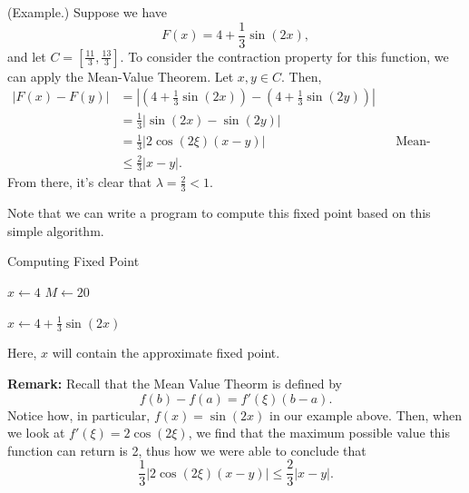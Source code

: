 \documentclass[letterpaper]{article}
\begin{document}
\begin{mdframed}
    (Example.) Suppose we have \[F(x) = 4 + \frac{1}{3}\sin(2x),\] and let $C = \left[\frac{11}{3}, \frac{13}{3}\right].$ To consider the contraction property for this function, we can apply the Mean-Value Theorem. Let $x, y \in C$. Then, 
    \[\begin{aligned}
        |F(x) - F(y)| &= \left|\left(4 + \frac{1}{3}\sin(2x)\right) - \left(4 + \frac{1}{3}\sin(2y)\right)\right| \\ 
            &= \frac{1}{3}|\sin(2x) - \sin(2y)| \\ 
            &= \frac{1}{3}|2\cos(2\xi)(x - y)| && \text{Mean-Value Theorem, See Remark} \\ 
            &\leq \frac{2}{3}\left|x - y\right|.
    \end{aligned}\]
    From there, it's clear that $\lambda = \frac{2}{3} < 1$. 

    \bigskip 

    Note that we can write a program to compute this fixed point based on this simple algorithm. 
    \begin{algorithm}[H]
        \caption{Computing Fixed Point}
        \label{alg:two}
        \begin{algorithmic}[1]
            \State $x \gets 4$
            \State $M \gets 20$

                \State $x \gets 4 + \frac{1}{3}\sin(2x)$
            \EndFor 
        \end{algorithmic}
    \end{algorithm}
    Here, $x$ will contain the approximate fixed point.
\end{mdframed}
\textbf{Remark:} Recall that the Mean Value Theorm is defined by  
\[f(b) - f(a) = f'(\xi)(b - a).\]
Notice how, in particular, $f(x) = \sin(2x)$ in our example above. Then, when we look at $f'(\xi) = 2\cos(2\xi)$, we find that the maximum possible value this function can return is 2, thus how we were able to conclude that 
\[\frac{1}{3}|2\cos(2\xi)(x - y)| \leq \frac{2}{3}\left|x - y\right|.\]
\end{document}
